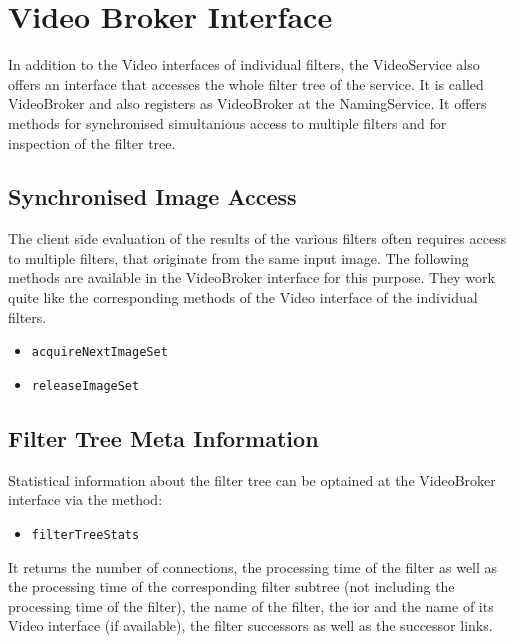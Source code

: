 
\label{lst:VideoExample}

\section{Video Broker Interface}

In addition to the Video interfaces of individual filters, the
VideoService also offers an interface that accesses the whole filter
tree of the service. It is called VideoBroker and also registers as
VideoBroker at the NamingService. It offers methods for synchronised
simultanious access to multiple filters and for inspection of the
filter tree.

\subsection{Synchronised Image Access}

The client side evaluation of the results of the various filters often
requires access to multiple filters, that originate from the same
input image. The following methods are available in the VideoBroker
interface for this purpose. They work quite like the corresponding
methods of the Video interface of the  individual filters.

\begin{itemize}
\item {\tt acquireNextImageSet}
\item {\tt releaseImageSet}
\end{itemize}

\subsection{Filter Tree Meta Information}

Statistical information about the filter tree can be optained at the
VideoBroker interface via the method:

\begin{itemize}
\item {\tt filterTreeStats}
\end{itemize}

It returns the number of connections, the processing time of the
filter as well as the processing time of the corresponding filter
subtree (not including the processing time of the filter), the name of
the filter, the ior and the name of its Video interface (if
available), the filter successors as well as the successor links.


